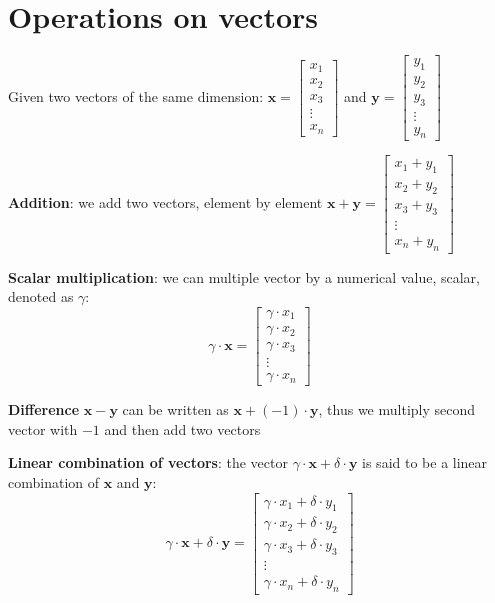 \documentclass[
]{book}
\theoremstyle{definition}
\theoremstyle{definition}
\theoremstyle{definition}
\theoremstyle{remark}
\begin{document}
\hypertarget{operations-on-vectors}{%
\section{Operations on vectors}\label{operations-on-vectors}}

Given two vectors of the same dimension:
\(\mathbf{x}=\begin{bmatrix}  x_1 \\  x_2 \\  x_3 \\  \vdots \\  x_n \end{bmatrix}\)
and
\(\mathbf{y}=\begin{bmatrix}  y_1 \\  y_2 \\  y_3 \\  \vdots \\  y_n \end{bmatrix}\)

\textbf{Addition}: we add two vectors, element by element \(\mathbf{x} + \mathbf{y}=\begin{bmatrix}  x_1 + y_1 \\  x_2 + y_2 \\  x_3 + y_3 \\  \vdots \\  x_n + y_n \end{bmatrix}\)

\textbf{Scalar multiplication}: we can multiple vector by a numerical value, scalar, denoted as \(\gamma\):
\[\gamma \cdot \mathbf{x} =\begin{bmatrix}
  \gamma \cdot x_1 \\ 
  \gamma \cdot x_2 \\
  \gamma \cdot x_3 \\
  \vdots \\
  \gamma \cdot x_n 
\end{bmatrix}\]

\textbf{Difference} \(\mathbf{x} - \mathbf{y}\) can be written as \(\mathbf{x} + (-1) \cdot \mathbf{y}\), thus we multiply second vector with \(-1\) and then add two vectors

\textbf{Linear combination of vectors}: the vector \(\gamma \cdot \mathbf{x} + \delta \cdot \mathbf{y}\) is said to be a linear combination of \(\mathbf{x}\) and \(\mathbf{y}\):
\[\gamma \cdot \mathbf{x} + \delta \cdot \mathbf{y} =\begin{bmatrix}
  \gamma \cdot x_1 + \delta \cdot y_1 \\ 
  \gamma \cdot x_2 + \delta \cdot y_2\\
  \gamma \cdot x_3 + \delta \cdot y_3\\
  \vdots \\
  \gamma \cdot x_n + \delta \cdot y_n
\end{bmatrix}\]
\end{document}
